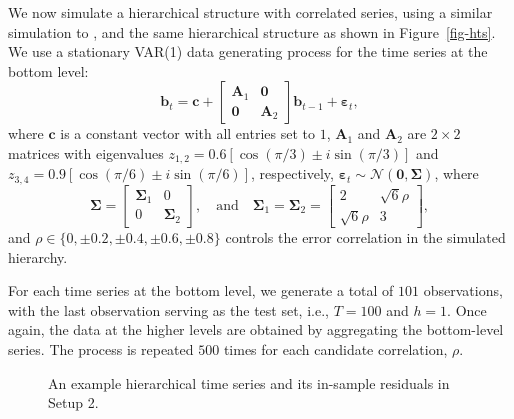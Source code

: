 \documentclass[
  11pt]{article}
\theoremstyle{plain}
\theoremstyle{remark}
\begin{document}
We now simulate a hierarchical structure with correlated series, using a
similar simulation to \citet{Wickramasuriya2021-am}, and the same
hierarchical structure as shown in Figure~\ref{fig-hts}. We use a
stationary VAR(1) data generating process for the time series at the
bottom level: \[
\bm{b}_t= \bm{c} + \left[\begin{array}{cc}
\bm{A}_1 & \bm{0} \\
\bm{0} & \bm{A}_2
\end{array}\right] \bm{b}_{t-1} + \bm{\varepsilon}_t,
\] where \(\bm{c}\) is a constant vector with all entries set to \(1\),
\(\bm{A}_1\) and \(\bm{A}_2\) are \(2 \times 2\) matrices with
eigenvalues \(z_{1,2}=0.6[\cos (\pi / 3) \pm i \sin (\pi / 3)]\) and
\(z_{3,4}=0.9[\cos (\pi / 6) \pm i \sin (\pi / 6)]\), respectively,
\(\bm{\varepsilon}_t \sim \mathcal{N}(\bm{0}, \bm{\Sigma})\), where \[
\bm{\Sigma}=\left[\begin{array}{cc}
\bm{\Sigma}_1 & 0 \\0 & \bm{\Sigma}_2
\end{array}\right], \quad\text{and}\quad \bm{\Sigma}_1=\bm{\Sigma}_2=\left[\begin{array}{cc}2 & \sqrt{6} \rho \\\sqrt{6} \rho & 3\end{array}\right],
\] and \(\rho \in \{0, \pm 0.2, \pm 0.4, \pm 0.6, \pm 0.8\}\) controls
the error correlation in the simulated hierarchy.

For each time series at the bottom level, we generate a total of \(101\)
observations, with the last observation serving as the test set, i.e.,
\(T=100\) and \(h=1\). Once again, the data at the higher levels are
obtained by aggregating the bottom-level series. The process is repeated
\(500\) times for each candidate correlation, \(\rho\).

\begin{figure}


\caption{\label{fig-corr-data}An example hierarchical time series and
its in-sample residuals in Setup 2.}

\end{figure}%
\end{document}
